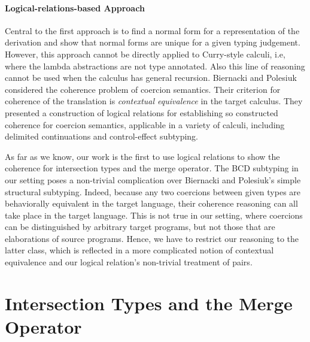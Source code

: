 \paragraph{Logical-relations-based Approach}

Central to the first approach is to find a normal form for a representation of
the derivation and show that normal forms are unique for a given typing
judgement. However, this approach cannot be directly applied to Curry-style
calculi, i.e, where the lambda abstractions are not type annotated. Also this
line of reasoning cannot be used when the calculus has general recursion.
Biernacki and Polesiuk~\citep{biernacki2015logical} considered the coherence
problem of coercion semantics. Their criterion for coherence of the translation is
\textit{contextual equivalence} in the target calculus. They presented a construction of
logical relations for establishing so constructed coherence for coercion semantics,
applicable in a variety of calculi, including delimited continuations and
control-effect subtyping.

As far as we know, our work is the first to use logical relations
to show the coherence for intersection types and the merge operator. The BCD
subtyping in our setting poses a non-trivial complication over Biernacki and
Polesiuk's simple structural subtyping. Indeed, because any two coercions
between given types are behaviorally equivalent in the target language, their
coherence reasoning can all take place in the target language. This is not true
in our setting, where coercions can be distinguished by arbitrary target
programs, but not those that are elaborations of source programs. Hence, we have to
restrict our reasoning to the latter class, which is reflected in a more
complicated notion of contextual equivalence and our logical relation's
non-trivial treatment of pairs.

\section{Intersection Types and the Merge Operator}

